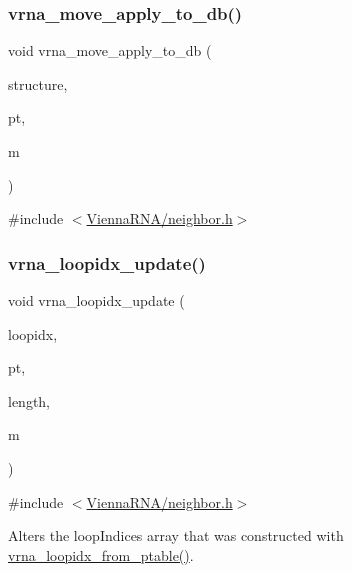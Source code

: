 \subsubsection{\texorpdfstring{vrna\+\_\+move\+\_\+apply\+\_\+to\+\_\+db()}{vrna\_move\_apply\_to\_db()}}
{\footnotesize\ttfamily void vrna\+\_\+move\+\_\+apply\+\_\+to\+\_\+db (\begin{DoxyParamCaption}\item[{char $\ast$}]{structure,  }\item[{const short $\ast$}]{pt,  }\item[{const \mbox{\hyperlink{group__neighbors_ga08630e00206cd163ea29c462bf5f4755}{vrna\+\_\+move\+\_\+t}} $\ast$}]{m }\end{DoxyParamCaption})}



{\ttfamily \#include $<$\mbox{\hyperlink{neighbor_8h}{Vienna\+R\+N\+A/neighbor.\+h}}$>$}

\mbox{\label{group__neighbors_ga5ceb55ee56494b1f5b7aaa758cb722d1}} 
\subsubsection{\texorpdfstring{vrna\+\_\+loopidx\+\_\+update()}{vrna\_loopidx\_update()}}
{\footnotesize\ttfamily void vrna\+\_\+loopidx\+\_\+update (\begin{DoxyParamCaption}\item[{int $\ast$}]{loopidx,  }\item[{const short $\ast$}]{pt,  }\item[{int}]{length,  }\item[{const \mbox{\hyperlink{group__neighbors_ga08630e00206cd163ea29c462bf5f4755}{vrna\+\_\+move\+\_\+t}} $\ast$}]{m }\end{DoxyParamCaption})}



{\ttfamily \#include $<$\mbox{\hyperlink{neighbor_8h}{Vienna\+R\+N\+A/neighbor.\+h}}$>$}



Alters the loop\+Indices array that was constructed with \mbox{\hyperlink{group__struct__utils_ga03e15af299be0866ff21da880c74b92e}{vrna\+\_\+loopidx\+\_\+from\+\_\+ptable()}}. 

